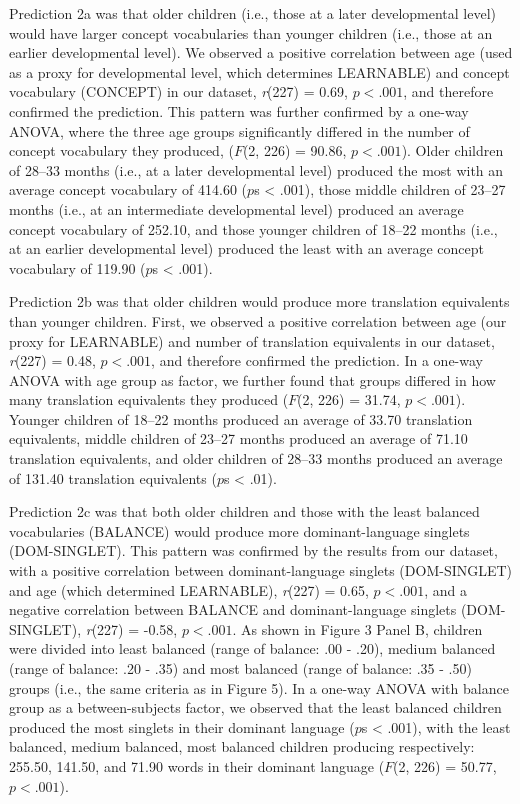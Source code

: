 \documentclass[
  english,
  ,man,floatsintext]{apa6}
\begin{document}
Prediction 2a was that older children (i.e., those at a later developmental level) would have larger concept vocabularies than younger children (i.e., those at an earlier developmental level). We observed a positive correlation between age (used as a proxy for developmental level, which determines LEARNABLE) and concept vocabulary (CONCEPT) in our dataset, \emph{r}(227) = 0.69, \(p < .001\), and therefore confirmed the prediction. This pattern was further confirmed by a one-way ANOVA, where the three age groups significantly differed in the number of concept vocabulary they produced, (\(F\)(2, 226) = 90.86, \(p < .001\)). Older children of 28--33 months (i.e., at a later developmental level) produced the most with an average concept vocabulary of 414.60 (\(p\)s \textless{} .001), those middle children of 23--27 months (i.e., at an intermediate developmental level) produced an average concept vocabulary of 252.10, and those younger children of 18--22 months (i.e., at an earlier developmental level) produced the least with an average concept vocabulary of 119.90 (\(p\)s \textless{} .001).

Prediction 2b was that older children would produce more translation equivalents than younger children. First, we observed a positive correlation between age (our proxy for LEARNABLE) and number of translation equivalents in our dataset, \emph{r}(227) = 0.48, \(p < .001\), and therefore confirmed the prediction. In a one-way ANOVA with age group as factor, we further found that groups differed in how many translation equivalents they produced (\(F\)(2, 226) = 31.74, \(p < .001\)). Younger children of 18--22 months produced an average of 33.70 translation equivalents, middle children of 23--27 months produced an average of 71.10 translation equivalents, and older children of 28--33 months produced an average of 131.40 translation equivalents (\(p\)s \textless{} .01).

Prediction 2c was that both older children and those with the least balanced vocabularies (BALANCE) would produce more dominant-language singlets (DOM-SINGLET). This pattern was confirmed by the results from our dataset, with a positive correlation between dominant-language singlets (DOM-SINGLET) and age (which determined LEARNABLE), \emph{r}(227) = 0.65, \(p < .001\), and a negative correlation between BALANCE and dominant-language singlets (DOM-SINGLET), \emph{r}(227) = -0.58, \(p < .001\). As shown in Figure 3 Panel B, children were divided into least balanced (range of balance: .00 - .20), medium balanced (range of balance: .20 - .35) and most balanced (range of balance: .35 - .50) groups (i.e., the same criteria as in Figure 5). In a one-way ANOVA with balance group as a between-subjects factor, we observed that the least balanced children produced the most singlets in their dominant language (\(p\)s \textless{} .001), with the least balanced, medium balanced, most balanced children producing respectively: 255.50, 141.50, and 71.90 words in their dominant language (\(F\)(2, 226) = 50.77, \(p < .001\)).
\end{document}
